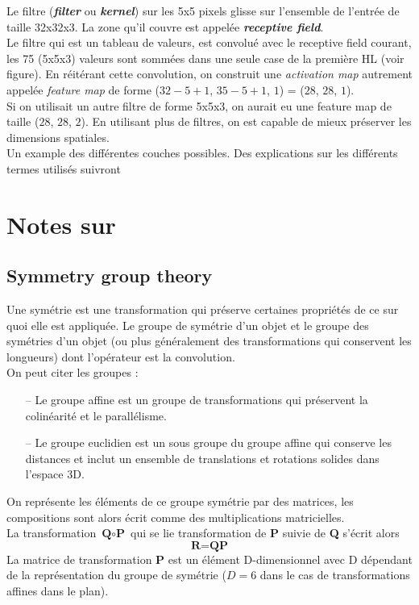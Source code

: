 \documentclass[a4paper,12pt]{report}
\newcommand\bk{\color{black}}
\newcommand\brick{\color{brick}}
\numberwithin{equation}{section} %
\begin{document}
Le filtre (\textit{\textbf{filter}} ou \textit{\textbf{kernel}}) sur les 5x5 pixels glisse sur l'ensemble de l'entrée de taille 32x32x3. La zone qu'il couvre est appelée \textbf{\textit{receptive field}}. \\
Le filtre qui est un tableau de valeurs, est convolué avec le receptive field courant, les 75 (5x5x3) valeurs sont sommées dans une seule case de la première HL (voir figure). En réitérant cette convolution, on construit une \textit{activation map} autrement appelée \textit{feature map} de forme ($32-5+1$, $35-5+1$, $1$) = ($28$, $28$, $1$). \\
Si on utilisait un autre filtre de forme 5x5x3, on aurait eu une feature map de taille ($28$, $28$, $2$). En utilisant plus de filtres, on est capable de mieux préserver les dimensions spatiales.\\
Un example des différentes couches possibles. Des explications sur les différents termes utilisés suivront

\newpage

\section{Notes sur \citep{gens2014deep}}
\brick \subsection{Symmetry group theory} \bk
Une symétrie est une transformation qui préserve certaines propriétés de ce sur quoi elle est appliquée. Le groupe de symétrie d'un objet et le groupe des symétries d'un objet (ou plus généralement des transformations qui conservent les longueurs) dont l'opérateur est la convolution.\\
On peut citer les groupes : 
\begin{itemize}[leftmargin=2cm]
\item[--] Le groupe affine est un groupe de transformations qui préservent la colinéarité et le parallélisme. 
\item[--] Le groupe euclidien est un sous groupe du groupe affine qui conserve les distances et inclut un ensemble de translations et rotations solides dans l'espace 3D.
\end{itemize}
On représente les éléments de ce groupe symétrie par des matrices, les compositions sont alors écrit comme des multiplications matricielles.\\
La transformation $\textbf{Q} \circ \textbf{P}$ qui se lie transformation de \textbf{P} suivie de \textbf{Q} s'écrit alors 
\begin{equation*}
\textbf{R} = \textbf{QP}
\end{equation*}
La matrice de transformation \textbf{P} est un élément D-dimensionnel avec D dépendant de la représentation du groupe de symétrie ($D=6$ dans le cas de transformations affines dans le plan).
\end{document}
